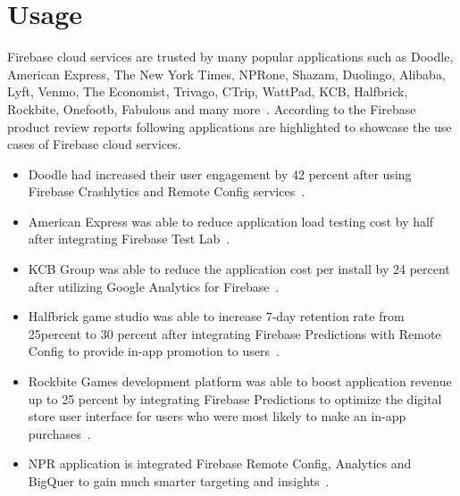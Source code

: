 \section{Usage} 

Firebase cloud services are trusted by many popular applications such
as Doodle\cite{hid-sp18-409-www-doodle}, American
Express\cite{hid-sp18-409-www-americanexpress}, The New York
Times\cite{hid-sp18-409-www-nytimes},
NPRone\cite{hid-sp18-409-www-npr},
Shazam\cite{hid-sp18-409-www-shazam},
Duolingo\cite{hid-sp18-409-www-duolingo},
Alibaba\cite{hid-sp18-409-www-alibaba},
Lyft\cite{hid-sp18-409-www-lyft}, Venmo\cite{hid-sp18-409-www-venmo},
The Economist\cite{hid-sp18-409-www-economist},
Trivago\cite{hid-sp18-409-www-trivago},
CTrip\cite{hid-sp18-409-www-ctrip},
WattPad\cite{hid-sp18-409-www-wattpad},
KCB\cite{hid-sp18-409-www-kcbgroup},
Halfbrick\cite{hid-sp18-409-www-halfbrick},
Rockbite\cite{hid-sp18-409-www-rockbitegames},
Onefootb\cite{hid-sp18-409-www-onefootball},
Fabulous\cite{hid-sp18-409-www-thefabulous} and many
more~\cite{hid-sp18-409-www-firebase,
  hid-sp18-409-www-firebase-usecases}.  According to the Firebase
product review reports following applications are highlighted to
showcase the use cases of Firebase cloud services.

\begin{itemize} \item Doodle had increased their user engagement by 42
  percent after using Firebase Crashlytics and Remote Config
  services~\cite{hid-sp18-409-www-doodle,
    hid-sp18-409-www-firebase-usecases}.
	
\item American Express was able to reduce application load testing
  cost by half after integrating Firebase Test
  Lab~\cite{hid-sp18-409-www-americanexpress}.
	
\item KCB Group was able to reduce the application cost per install by
  24 percent after utilizing Google Analytics for
  Firebase~\cite{hid-sp18-409-www-kcbgroup,hid-sp18-409-www-firebase-usecases}.
	
\item Halfbrick game studio was able to increase 7-day retention rate
  from 25percent to 30 percent after integrating Firebase Predictions
  with Remote Config to provide in-app promotion to
  users~\cite{hid-sp18-409-www-halfbrick,hid-sp18-409-www-firebase-usecases}.
	
\item Rockbite Games development platform was able to boost
  application revenue up to 25 percent by integrating Firebase
  Predictions to optimize the digital store user interface for users
  who were most likely to make an in-app
  purchases~\cite{hid-sp18-409-www-rockbitegames}.
	
\item NPR application is integrated Firebase Remote Config, Analytics
  and BigQuer to gain much smarter targeting and
  insights~\cite{hid-sp18-409-www-firebase-usecases}. 

\end{itemize}

